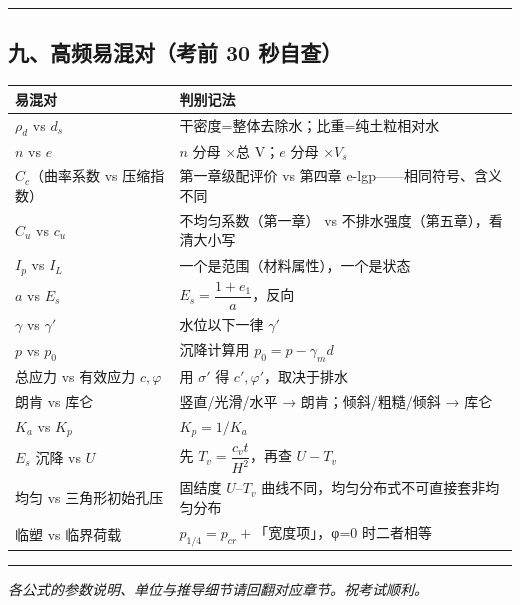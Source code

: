 \documentclass[
]{article}
\newcounter{none} %
\begin{document}
\begin{center}\rule{0.5\linewidth}{0.5pt}\end{center}

\subsection{九、高频易混对（考前 30
秒自查）}\label{ux4e5dux9ad8ux9891ux6613ux6df7ux5bf9ux8003ux524d-30-ux79d2ux81eaux67e5}

{\def\LTcaptype{none} %
\begin{longtable}[]{@{}
  >{\raggedright\arraybackslash}p{}
  >{\raggedright\arraybackslash}p{}@{}}
\toprule\noalign{}
\begin{minipage}[b]{\linewidth}\raggedright
易混对
\end{minipage} & \begin{minipage}[b]{\linewidth}\raggedright
判别记法
\end{minipage} \\
\midrule\noalign{}
\endhead
\bottomrule\noalign{}
\endlastfoot
\(\rho_d\) vs \(d_s\) & 干密度=整体去除水；比重=纯土粒相对水 \\
\(n\) vs \(e\) & \(n\) 分母 ×总 V；\(e\) 分母 ×\(V_s\) \\
\(C_c\)（曲率系数 vs 压缩指数） & 第一章级配评价 vs 第四章
e-lgp------相同符号、含义不同 \\
\(C_u\) vs \(c_u\) & 不均匀系数（第一章） vs
不排水强度（第五章），看清大小写 \\
\(I_p\) vs \(I_L\) & 一个是范围（材料属性），一个是状态 \\
\(a\) vs \(E_s\) & \(E_s=\dfrac{1+e_1}{a}\)，反向 \\
\(\gamma\) vs \(\gamma'\) & 水位以下一律 \(\gamma'\) \\
\(p\) vs \(p_0\) & 沉降计算用 \(p_0=p-\gamma_md\) \\
总应力 vs 有效应力 \(c,\varphi\) & 用 \(\sigma'\) 得
\(c',\varphi'\)，取决于排水 \\
朗肯 vs 库仑 & 竖直/光滑/水平 → 朗肯；倾斜/粗糙/倾斜 → 库仑 \\
\(K_a\) vs \(K_p\) & \(K_p=1/K_a\) \\
\(E_s\) 沉降 vs \(U\) & 先 \(T_v=\dfrac{c_vt}{H^2}\)，再查 \(U-T_v\) \\
均匀 vs 三角形初始孔压 & 固结度 \(U\)--\(T_v\)
曲线不同，均匀分布式不可直接套非均匀分布 \\
临塑 vs 临界荷载 & \(p_{1/4}=p_{cr}+\)「宽度项」，φ=0 时二者相等 \\
\end{longtable}
}

\begin{center}\rule{0.5\linewidth}{0.5pt}\end{center}

\emph{各公式的参数说明、单位与推导细节请回翻对应章节。祝考试顺利。}
\end{document}
